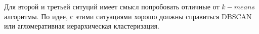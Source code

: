 \documentclass[12pt, a4paper, oneside]{article}
\begin{document}
{\begin{minipage}[t]{0.45\textwidth}
\begin{center}
	\end{center}
\end{minipage}

Для второй и третьей ситуций имеет смысл попробовать отличные от $k-means$ алгоритмы. По идее, с этими ситуациями хорошо должны справиться DBSCAN или агломеративная иерархическая кластеризация. 
} 
\end{document}
